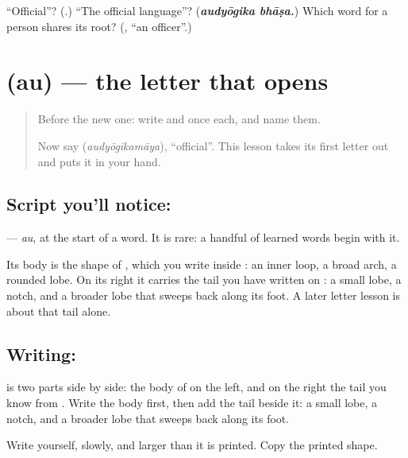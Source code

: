 \begin{tcolorbox}[breakable,colback=teal!4,colframe=teal!35!black,title={Before you move on}]
\textquotedblleft{}Official\textquotedblright{}? (\textbf{}.) \textquotedblleft{}The official language\textquotedblright{}? (\emph{\textbf{audyōgika bhāṣa.}}) Which word for a person shares its root? (\textbf{}, \textquotedblleft{}an officer\textquotedblright{}.)
\end{tcolorbox}
\section[\texorpdfstring{\ml{ഔ} (au)}{ഔ (au)}]{ (au) — the letter that opens }

\label{lesson:ML-W342-au}



\begin{quote}
Before the new one: write \textbf{} and \textbf{} once each, and name them.

Now say \textbf{} (\emph{audyōgikamāya}), \textquotedblleft{}official\textquotedblright{}. This lesson takes its first letter out and puts it in your hand.
\end{quote}

\subsection*{Script you'll notice: }
\textbf{} — \emph{au}, at the start of a word. It is rare: a handful of learned words begin with it.

Its body is the shape of \textbf{}, which you write inside \textbf{}: an inner loop, a broad arch, a rounded lobe. On its right it carries the tail you have written on \textbf{}: a small lobe, a notch, and a broader lobe that sweeps back along its foot. A later letter lesson is about that tail alone.

\subsection*{Writing: }
\textbf{} is two parts side by side: the body of \textbf{} on the left, and on the right the tail you know from \textbf{}. Write the body first, then add the tail beside it: a small lobe, a notch, and a broader lobe that sweeps back along its foot.

Write \textbf{} yourself, slowly, and larger than it is printed. Copy the printed shape.

